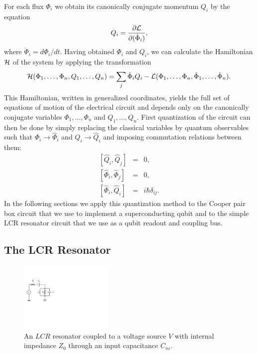 %
For each flux $\Phi_i$ we obtain its canonically conjugate momentum $Q_i$ by the equation
%
\begin{equation}
Q_i = \frac{\partial \begin{mathcal}L\end{mathcal}}{\partial(\dot{\Phi}_i)}, \label{eq:canonical_momentum}
\end{equation}
%
where $\dot{\Phi}_i=d\Phi_i/dt$. Having obtained $\Phi_i$ and $Q_i$, we can calculate the Hamiltonian $\begin{mathcal}H\end{mathcal}$ of the system by applying the transformation
%
\begin{equation}
\begin{mathcal}H\end{mathcal}(\Phi_1,\hdots,\Phi_n,Q_1,\hdots,Q_n) = \sum\limits_j \dot{\Phi}_i Q_i - \begin{mathcal}L\end{mathcal}(\Phi_1,\hdots,\Phi_n,\dot{\Phi}_1,\hdots,\dot{\Phi}_n). \label{eq:l_to_h}
\end{equation}
%
This Hamiltonian, written in generalized coordinates, yields the full set of equations of motion of the electrical circuit and depends only on the canonically conjugate variables $\Phi_{1},\hdots,\Phi_n$ and $Q_1,\hdots,Q_n$. First quantization of the circuit can then be done by simply replacing the classical variables by quantum observables such that $\Phi_i\to\hat{\Phi}_i$ and $Q_i\to\hat{Q}_i$ and imposing commutation relations between them:
%
\begin{eqnarray}
\left[\hat{Q}_i,\hat{Q}_j\right] & = & 0, \\
\left[\hat{\Phi}_i,\hat{\Phi}_j \right] & = & 0, \\
\left[\hat{\Phi}_i,\hat{Q}_i\right] & = & i\hbar\delta_{ij}. \label{eq:quantization_commutation_relations}
\end{eqnarray}
% 
In the following sections we apply this quantization method to the Cooper pair box circuit that we use to implement a superconducting qubit and to the simple LCR resonator circuit that we use as a qubit readout and coupling bus.

\subsection{The LCR Resonator}

\begin{figure}
	\centering
	\includegraphics[width=0.4\textwidth]{"./material/figures/introduction/lcr_resonator"}
	\caption[]{An $LCR$ resonator coupled to a voltage source $V$ with internal impedance $Z_0$ through an input capacitance $C_{in}$.}
	\label{fig:lcr_resonator}
\end{figure}

